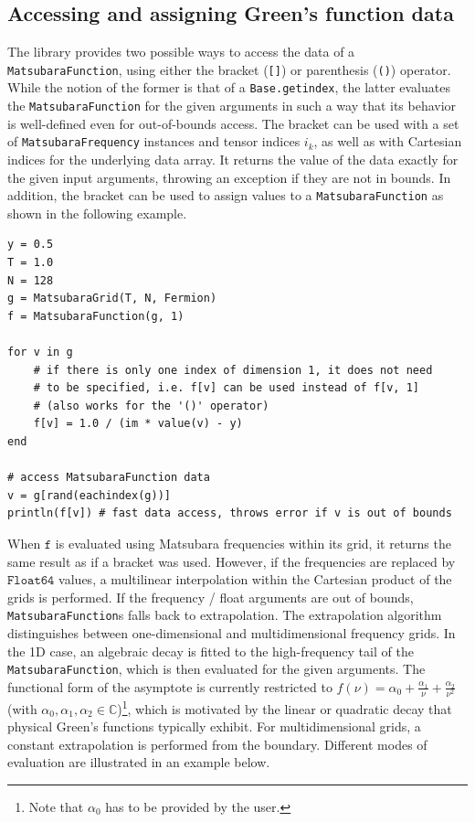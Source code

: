 \documentclass{SciPost}
\begin{document}
\subsection{Accessing and assigning Green's function data}
\label{subsec:gfdata}

The library provides two possible ways to access the data of a \texttt{MatsubaraFunction}, using either the bracket (\texttt{[]}) or parenthesis (\texttt{()}) operator. While the notion of the former is that of a \texttt{Base.getindex}, the latter evaluates the \texttt{MatsubaraFunction} for the given arguments in such a way that its behavior is well-defined even for out-of-bounds access. The bracket can be used with a set of \texttt{MatsubaraFrequency} instances and tensor indices $i_k$, as well as with Cartesian indices for the underlying data array. It returns the value of the data exactly for the given input arguments, throwing an exception if they are not in bounds. In addition, the bracket can be used to assign values to a \texttt{MatsubaraFunction} as shown in the following example.
%
\begin{verbatim}
y = 0.5
T = 1.0
N = 128
g = MatsubaraGrid(T, N, Fermion)
f = MatsubaraFunction(g, 1)

for v in g
    # if there is only one index of dimension 1, it does not need 
    # to be specified, i.e. f[v] can be used instead of f[v, 1] 
    # (also works for the '()' operator)
    f[v] = 1.0 / (im * value(v) - y)
end 

# access MatsubaraFunction data
v = g[rand(eachindex(g))]
println(f[v]) # fast data access, throws error if v is out of bounds
\end{verbatim}
%
When $\texttt{f}$ is evaluated using Matsubara frequencies within its grid, it returns the same result as if a bracket was used. However, if the frequencies are replaced by $\texttt{Float64}$ values, a multilinear interpolation within the Cartesian product of the grids is performed. If the frequency / float arguments are out of bounds, \texttt{MatsubaraFunction}s falls back to extrapolation. The extrapolation algorithm distinguishes between one-dimensional and multidimensional frequency grids. In the 1D case, an algebraic decay is fitted to the high-frequency tail of the \texttt{MatsubaraFunction}, which is then evaluated for the given arguments. The functional form of the asymptote is currently restricted to $f(\nu) = \alpha_0 + \tfrac{\alpha_1}{\nu} + \tfrac{\alpha_2}{\nu^2}$ (with $\alpha_0, \alpha_1, \alpha_2 \in \mathbb{C}$)\footnote{ Note that $\alpha_0$ has to be provided by the user.}, which is motivated by the linear or quadratic decay that physical Green's functions typically exhibit. For multidimensional grids, a constant extrapolation is performed from the boundary. Different modes of evaluation are illustrated in an example below.
\end{document}
